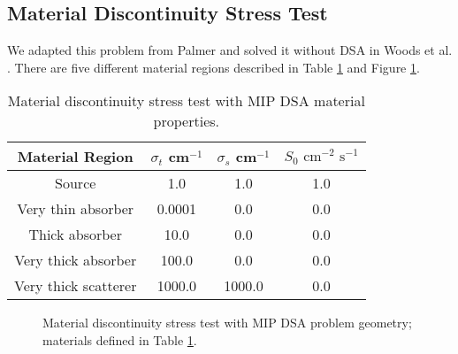 \documentclass[12pt]{article}
\begin{document}
\subsection{Material Discontinuity Stress Test}
We adapted this problem from Palmer \cite{PalmerDissertation} and solved it without DSA in Woods et al. \cite{WoodsHoDgfemXyCurved}. There are five different material regions described in Table \ref{tab:MaterialDiscontinuityProperties} and Figure \ref{fig:MaterialDiscontinuityMesh}.

\begin{table}[!htb]
\centering
{\renewcommand{\arraystretch}{1.5}
\begin{tabular}{|c|c|c|c|}
\hline
Material Region & $\sigma_t$ cm$^{-1}$ & $\sigma_s$ cm$^{-1}$ & $S_0 \text{ cm}^{-2} \text{ s}^{-1}$ \\\hline
Source & 1.0 & 1.0 & 1.0 \\
Very thin absorber & 0.0001 & 0.0 & 0.0 \\
Thick absorber & 10.0 & 0.0 & 0.0 \\
Very thick absorber & 100.0 & 0.0 & 0.0 \\
Very thick scatterer & 1000.0 & 1000.0 & 0.0 \\
\hline
\end{tabular}}
\caption{Material discontinuity stress test with MIP DSA material properties.}
\label{tab:MaterialDiscontinuityProperties}
\end{table}

\begin{figure}[!hp]
\centering
{}
\caption{Material discontinuity stress test with MIP DSA problem geometry; materials defined in Table \ref{tab:MaterialDiscontinuityProperties}.}
\label{fig:MaterialDiscontinuityMesh}
\end{figure}
\end{document}
